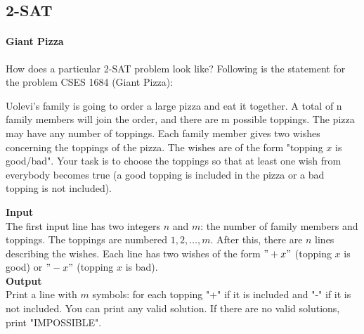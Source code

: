 \documentclass[letterpaper,landscape]{article}
\begin{document}
\subsection{2-SAT}



\paragraph{Giant Pizza}

How does a particular 2-SAT problem look like?
Following is the statement for the problem CSES 1684 (Giant Pizza):

\begin{IOFrame}
\sffamily\raggedright
\setlength{\parindent}{0pt}
\setlength{\parskip}{0.4em}
Uolevi's family is going to order a large pizza and eat it together. A total of n family members will join the order, and there are m possible toppings. The pizza may have any number of toppings.
Each family member gives two wishes concerning the toppings of the pizza. The wishes are of the form "topping $x$ is good/bad". Your task is to choose the toppings so that at least one wish from everybody becomes true (a good topping is included in the pizza or a bad topping is not included).

\textbf{Input} \\[0.1cm]

\noindent The first input line has two integers $n$ and $m$: the number of family members and toppings. The toppings are numbered $1,2,\dots,m$.
    After this, there are $n$ lines describing the wishes. Each line has two wishes of the form $"+ x"$ (topping $x$ is good) or $"- x"$ (topping $x$ is bad).\\

\vspace{5px}
\textbf{Output} \\[0.1cm]

\noindent Print a line with $m$ symbols: for each topping "+" if it is included and "-" if it is not included. You can print any valid solution.
If there are no valid solutions, print "IMPOSSIBLE".
\end{IOFrame}
\end{document}
